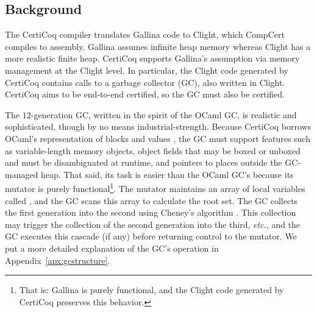 

\subsection{Background}
\label{sec:gcbackground}

The CertiCoq compiler \cite{certicoqpaper} translates Gallina code to
Clight, which CompCert~\cite{leroy:compcert} compiles to assembly.
Gallina assumes infinite heap memory whereas Clight has a 
more realistic finite heap. 
CertiCoq supports Gallina's assumption via 
memory management at the Clight level.
In particular, the Clight code generated by CertiCoq contains 
calls to a garbage collector (GC), also written in Clight. 
CertiCoq aims to be end-to-end certified, so the GC must also be certified.

The $12$-generation GC, written in the spirit of the OCaml GC,
is realistic and sophisticated, though by no means
industrial-strength.
Because CertiCoq borrows OCaml's representation of blocks and
values \cite{realworldocaml}, the GC must support features such as
variable-length memory objects, object fields that may be boxed
or unboxed and must be disambiguated at runtime, and pointers to places
outside the GC-managed heap.
That said, its task is easier than the OCaml GC's because
its mutator is purely functional\footnote{That is: Gallina is purely functional, and
the Clight code generated by CertiCoq preserves this behavior.}.
The mutator maintains an array of
local variables called , and the GC scans this array to
calculate the root set. The GC collects the first generation
into the second using Cheney's algorithm \cite{cheney:gc}.
This collection may trigger the collection of the second generation
into the third, \emph{etc.}, and the GC executes this cascade (if any)
before returning control to the mutator. We put a 
more detailed explanation of the GC's operation in Appendix~\ref{apx:gcstructure}.

